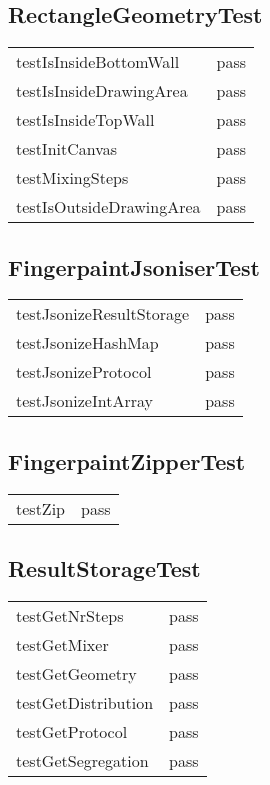 \subsection*{RectangleGeometryTest}
\begin{tabular}{l|l}
testIsInsideBottomWall       & pass \\
testIsInsideDrawingArea    & pass \\
testIsInsideTopWall             & pass \\
testInitCanvas                    & pass \\
testMixingSteps                  & pass \\
testIsOutsideDrawingArea & pass \\
\end{tabular}

\subsection*{FingerpaintJsoniserTest}
\begin{tabular}{l|l}
testJsonizeResultStorage & pass \\
testJsonizeHashMap         & pass \\
testJsonizeProtocol           & pass \\
testJsonizeIntArray          & pass \\
\end{tabular}

\subsection*{FingerpaintZipperTest}
\begin{tabular}{l|l}
testZip & pass \\
\end{tabular}

\subsection*{ResultStorageTest}
\begin{tabular}{l|l}
testGetNrSteps       & pass \\
testGetMixer           & pass \\
testGetGeometry    & pass \\
testGetDistribution  & pass \\
testGetProtocol       & pass \\
testGetSegregation & pass \\
\end{tabular}

